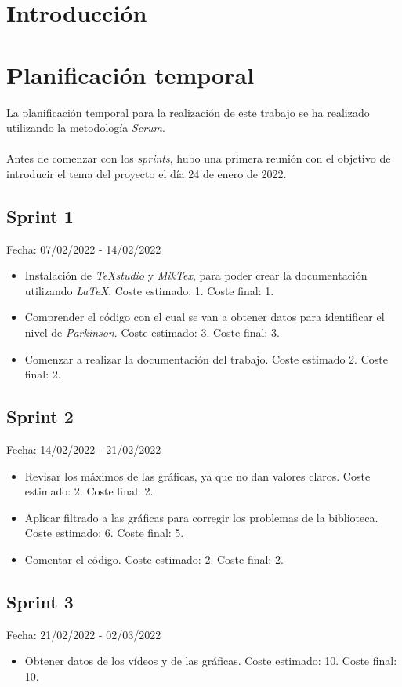 
\section{Introducción}

\section{Planificación temporal}
La planificación temporal para la realización de este trabajo se ha realizado utilizando la metodología \textit{Scrum}.\\
\\
Antes de comenzar con los \textit{sprints}, hubo una primera reunión con el objetivo de introducir el tema del proyecto el día 24 de enero de 2022.

\subsection{Sprint 1}
Fecha: 07/02/2022 - 14/02/2022
\begin{itemize}
	\item Instalación de \textit{TeXstudio} y \textit{MikTex}, para poder crear la documentación utilizando \textit{LaTeX}. Coste estimado: 1. Coste final: 1.
	\item Comprender el código con el cual se van a obtener datos para identificar el nivel de \textit{Parkinson}. Coste estimado: 3. Coste final: 3.
	\item Comenzar a realizar la documentación del trabajo. Coste estimado 2. Coste final: 2.
\end{itemize}

\subsection{Sprint 2}
Fecha: 14/02/2022 - 21/02/2022
\begin{itemize}
	\item Revisar los máximos de las gráficas, ya que no dan valores claros. Coste estimado: 2. Coste final: 2. 
	\item Aplicar filtrado a las gráficas para corregir los problemas de la biblioteca. Coste estimado: 6. Coste final: 5.
	\item Comentar el código. Coste estimado: 2. Coste final: 2.
\end{itemize}

\subsection{Sprint 3}
Fecha: 21/02/2022 - 02/03/2022
\begin{itemize}
	\item Obtener datos de los vídeos y de las gráficas. Coste estimado: 10. Coste final: 10. 
\end{itemize}

